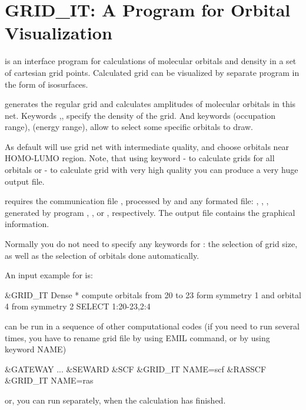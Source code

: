 \section{GRID\_IT: A Program for Orbital Visualization}
\label{TUT:sec:gridit}

 is an interface program for calculations of molecular
orbitals and density in a set of cartesian grid points. Calculated grid
can be visualized by separate program  in 
the form of isosurfaces. 

 generates the regular grid and calculates amplitudes of 
molecular orbitals in this net. Keywords ,,
 specify the density of the grid. And keywords  (occupation range),
 (energy range),  allow to select some specific orbitals to draw.

As default  will use grid net with intermediate quality,
and choose orbitals near HOMO-LUMO region. Note, that using keyword
 - to calculate grids for all orbitals or  -
to calculate grid with very high quality you can produce a very huge
output file.


\label{TUT:sec:gridit_dependencies}
 requires the communication file ,
processed by  and any formated  file: ,
, , generated by program , ,
or , respectively. The output file  
contains the graphical information.

Normally you do not need to specify any keywords for :
the selection of grid size, as well as the selection of orbitals done automatically.

An input example for  is:

\begin{inputlisting}
 &GRID_IT 
Dense
* compute orbitals from 20 to 23 form symmetry 1 and orbital 4 from symmetry 2
SELECT
1:20-23,2:4
\end{inputlisting}

 can be run in a sequence of other computational codes
(if you need to run  several times, you have to rename 
grid file by using EMIL command, or by using keyword NAME)
\begin{inputlisting}
&GATEWAY
 ...
&SEWARD 
&SCF
&GRID_IT
NAME=scf
&RASSCF
&GRID_IT
NAME=ras
\end{inputlisting}
or, you can run  separately, when the calculation has finished.

